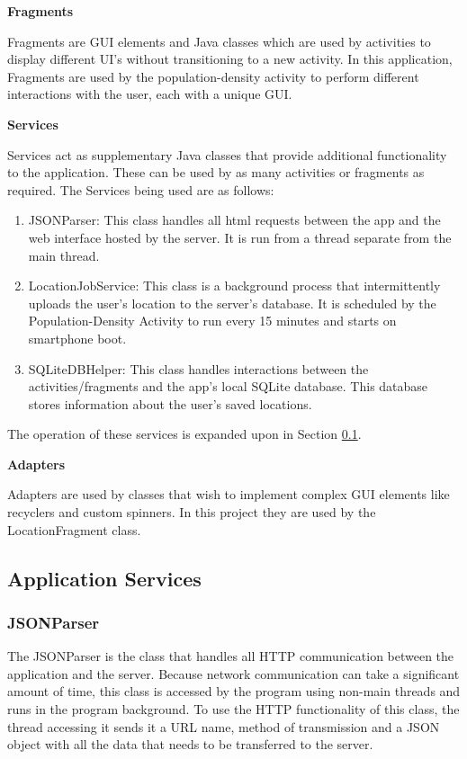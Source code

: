 \textbf{Fragments}

Fragments are GUI elements and Java classes which are used by activities to display different UI's without transitioning to a new activity. In this application, Fragments are used by the population-density activity to perform different interactions with the user, each with a unique GUI.

\textbf{Services}

Services act as supplementary Java classes that provide additional functionality to the application. These can be used by as many activities or fragments as required. The Services being used are as follows:
\begin{enumerate}
    \item JSONParser: This class handles all html requests between the app and the web interface hosted by the server. It is run from a thread separate from the main thread.
    \item LocationJobService: This class is a background process that intermittently uploads the user's location to the server's database. It is scheduled by the Population-Density Activity to run every 15 minutes and starts on smartphone boot.
    \item SQLiteDBHelper: This class handles interactions between the activities/fragments and the app's local SQLite database. This database stores information about the user's saved locations.
\end{enumerate}
The operation of these services is expanded upon in Section \ref{sec:app_services}.

\textbf{Adapters}

Adapters are used by classes that wish to implement complex GUI elements like recyclers and custom spinners. In this project they are used by the LocationFragment class. 

\subsection{Application Services} 
\label{sec:app_services}

\subsubsection{JSONParser}
The JSONParser is the class that handles all HTTP communication between the application and the server. Because network communication can take a significant amount of time, this class is accessed by the program using non-main threads and runs in the program background. To use the HTTP functionality of this class, the thread accessing it sends it a URL name, method of transmission and a JSON object with all the data that needs to be transferred to the server.

